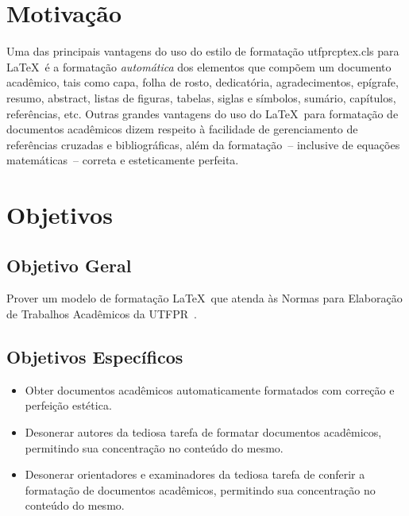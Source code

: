 \section{Motiva\c{c}\~ao}

Uma das principais vantagens do uso do estilo de formata\c{c}\~ao {\ttfamily utfprcptex.cls} para \LaTeX\ \'e a formata\c{c}\~ao \textit{autom\'atica} dos elementos que comp\~oem um documento acad\^emico, tais como capa, folha de rosto, dedicat\'oria, agradecimentos, ep\'igrafe, resumo, abstract, listas de figuras, tabelas, siglas e s\'imbolos, sum\'ario, cap\'itulos, refer\^encias, etc. Outras grandes vantagens do uso do \LaTeX\ para formata\c{c}\~ao de documentos acad\^emicos dizem respeito \`a facilidade de gerenciamento de refer\^encias cruzadas e bibliogr\'aficas, al\'em da formata\c{c}\~ao~-- inclusive de equa\c{c}\~oes  matem\'aticas~-- correta e esteticamente perfeita.

\section{Objetivos}

\subsection{Objetivo Geral}

Prover um modelo de formata\c{c}\~ao \LaTeX\ que atenda \`as Normas para Elabora\c{c}\~ao de Trabalhos Acad\^emicos da UTFPR~\cite{UTFPR2008}.

\subsection{Objetivos Espec\'ificos}

\begin{itemize}
	\item Obter documentos acad\^emicos automaticamente formatados com corre\c{c}\~ao e perfei\c{c}\~ao est\'etica.
	\item Desonerar autores da tediosa tarefa de formatar documentos acad\^emicos, permitindo sua concentra\c{c}\~ao no conte\'udo do mesmo.
	\item Desonerar orientadores e examinadores da tediosa tarefa de conferir a formata\c{c}\~ao de documentos acad\^emicos, permitindo sua concentra\c{c}\~ao no conte\'udo do mesmo.
\end{itemize} 